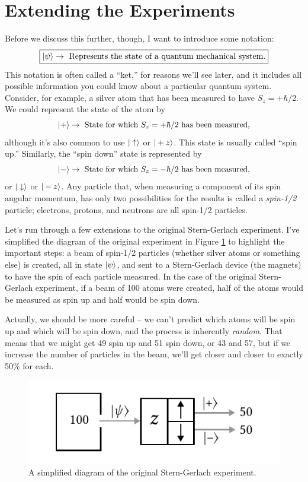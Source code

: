%
%
%

\section{Extending the Experiments}

Before we discuss this further, though, I want to introduce some notation:
\begin{equation}
\label{eq_ket_definition}
\boxed{
| \psi \rangle \rightarrow \text{ Represents the state of a quantum mechanical system.}
}
\end{equation}
This notation is often called a ``ket,'' for reasons we'll see later, and it includes all possible information you could know about a particular quantum system.  Consider, for example, a silver atom that has been measured to have $S_z = +\hbar/2$.  We could represent the state of the atom by 
\[
| + \rangle \rightarrow \text{ State for which $S_z = +\hbar/2$ has been measured},
\]
although it's also common to use $| \uparrow \rangle$ or $| +z \rangle$.  This state is usually called ``spin up.''  Similarly, the ``spin down'' state is represented by 
\[
| - \rangle \rightarrow \text{ State for which $S_z = -\hbar/2$ has been measured},
\]
or  $| \downarrow \rangle$ or $| -z \rangle$.  Any particle that, when measuring a component of its spin angular momentum, has only two possibilities for the results is called a \emph{spin-1/2} particle; electrons, protons, and neutrons are all spin-1/2 particles.

Let's run through a few extensions to the original Stern-Gerlach experiment.  I've simplified the diagram of the original experiment in Figure \ref{fig_sg_0} to highlight the important steps: a beam of spin-1/2 particles (whether silver atoms or something else) is created, all in state $| \psi \rangle$, and sent to a Stern-Gerlach device (the magnets) to have the spin of each particle measured. In the case of the original Stern-Gerlach experiment, if a beam of 100 atoms were created, half of the atoms would be measured as spin up and half would be spin down.

Actually, we should be more careful -- we can't predict which atoms will be spin up and which will be spin down, and the process is inherently \emph{random}.  That means that we might get 49 spin up and 51 spin down, or 43 and 57, but if we increase the number of particles in the beam, we'll get closer and closer to exactly 50\% for each.   

\begin{figure}
\centering\includegraphics[width=0.6\linewidth]{Figures/Chapter 1/fig_sg_0.pdf}
\caption{A simplified diagram of the original Stern-Gerlach experiment.}
\label{fig_sg_0}
\end{figure}


